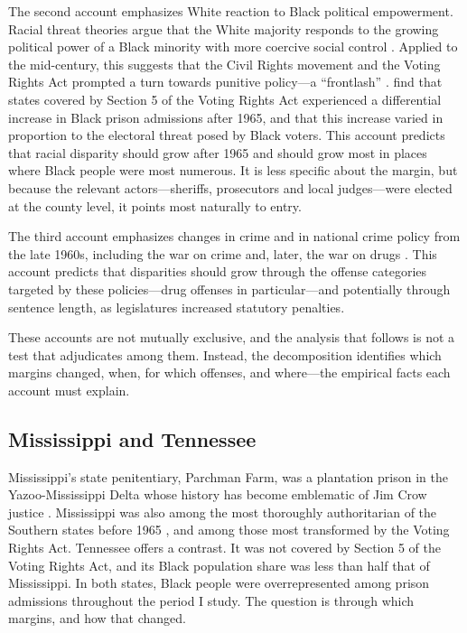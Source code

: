 \documentclass[12pt]{article}
\begin{document}
The second account emphasizes White reaction to Black political empowerment.  Racial threat theories argue that the White majority responds to the growing political power of a Black minority with more coercive social control \citep{Blalock:1967ud}.  Applied to the mid-century, this suggests that the Civil Rights movement and the Voting Rights Act prompted a turn towards punitive policy---a ``frontlash'' \citep{Weaver:2007vr}.  \cite{EubankFresh:2021gg} find that states covered by Section 5 of the Voting Rights Act experienced a differential increase in Black prison admissions after 1965, and that this increase varied in proportion to the electoral threat posed by Black voters.  This account predicts that racial disparity should grow after 1965 and should grow most in places where Black people were most numerous.  It is less specific about the margin, but because the relevant actors---sheriffs, prosecutors and local judges---were elected at the county level, it points most naturally to entry.

The third account emphasizes changes in crime and in national crime policy from the late 1960s, including the war on crime and, later, the war on drugs \citep{Beckett:1997vq,Murakawa:2014vj,Hinton:2016tb,Alexander:2012tj}.  This account predicts that disparities should grow through the offense categories targeted by these policies---drug offenses in particular---and potentially through sentence length, as legislatures increased statutory penalties.

These accounts are not mutually exclusive, and the analysis that follows is not a test that adjudicates among them.  Instead, the decomposition identifies which margins changed, when, for which offenses, and where---the empirical facts each account must explain.

\subsection*{Mississippi and Tennessee}

\noindent Mississippi's state penitentiary, Parchman Farm, was a plantation prison in the Yazoo-Mississippi Delta whose history has become emblematic of Jim Crow justice \citep{Oshinsky:1997up}.  Mississippi was also among the most thoroughly authoritarian of the Southern states before 1965 \citep{Mickey:2015vh}, and among those most transformed by the Voting Rights Act.  Tennessee offers a contrast.  It was not covered by Section 5 of the Voting Rights Act, and its Black population share was less than half that of Mississippi.  In both states, Black people were overrepresented among prison admissions throughout the period I study.  The question is through which margins, and how that changed.
\end{document}
